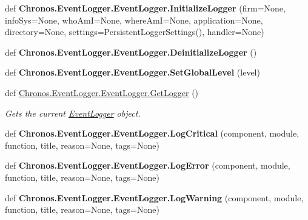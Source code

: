 \begin{DoxyCompactItemize}
\item 
def {\bfseries Chronos.\+Event\+Logger.\+Event\+Logger.\+Initialize\+Logger} (firm=None, info\+Sys=None, who\+AmI=None, where\+AmI=None, application=None, directory=None, settings=Persistent\+Logger\+Settings(), handler=None)\hypertarget{group__PyInfrastructure_ga8c653e6aed9184932cfe7ec54d9b58bf}{}\label{group__PyInfrastructure_ga8c653e6aed9184932cfe7ec54d9b58bf}

\item 
def {\bfseries Chronos.\+Event\+Logger.\+Event\+Logger.\+Deinitialize\+Logger} ()\hypertarget{group__PyInfrastructure_ga17e490fb14d28dbb5a0cff013d21bff0}{}\label{group__PyInfrastructure_ga17e490fb14d28dbb5a0cff013d21bff0}

\item 
def {\bfseries Chronos.\+Event\+Logger.\+Event\+Logger.\+Set\+Global\+Level} (level)\hypertarget{group__PyInfrastructure_ga987290fa23df3c8515130cacb6d2fdc5}{}\label{group__PyInfrastructure_ga987290fa23df3c8515130cacb6d2fdc5}

\item 
def \hyperlink{group__PyInfrastructure_ga22b169d02d02c1c7db9de09d26cf1319}{Chronos.\+Event\+Logger.\+Event\+Logger.\+Get\+Logger} ()
\begin{DoxyCompactList}\small\item\em Gets the current \hyperlink{classChronos_1_1EventLogger_1_1EventLogger}{Event\+Logger} object. \end{DoxyCompactList}\item 
def {\bfseries Chronos.\+Event\+Logger.\+Event\+Logger.\+Log\+Critical} (component, module, function, title, reason=None, tags=None)\hypertarget{group__PyInfrastructure_ga55a421e365620d9159fbbc17e74e90f0}{}\label{group__PyInfrastructure_ga55a421e365620d9159fbbc17e74e90f0}

\item 
def {\bfseries Chronos.\+Event\+Logger.\+Event\+Logger.\+Log\+Error} (component, module, function, title, reason=None, tags=None)\hypertarget{group__PyInfrastructure_ga17a7ff2eacb6281c27b6243d35e08d4d}{}\label{group__PyInfrastructure_ga17a7ff2eacb6281c27b6243d35e08d4d}

\item 
def {\bfseries Chronos.\+Event\+Logger.\+Event\+Logger.\+Log\+Warning} (component, module, function, title, reason=None, tags=None)\hypertarget{group__PyInfrastructure_gac32f037d52276ada19bf2f36da282dff}{}\label{group__PyInfrastructure_gac32f037d52276ada19bf2f36da282dff}


\end{DoxyCompactItemize}
